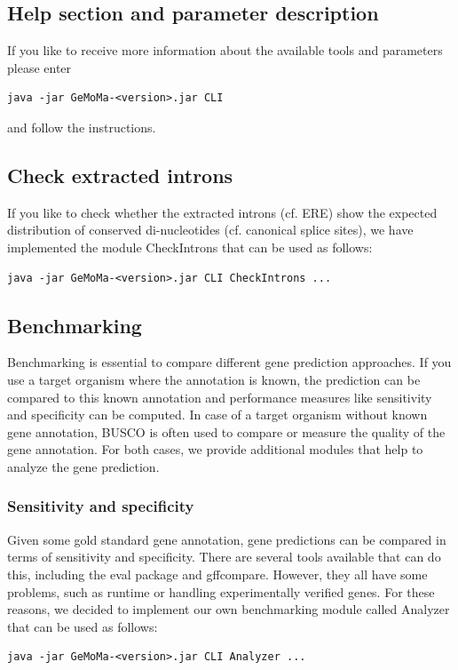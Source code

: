 \documentclass{article}
\begin{document}
\subsection{Help section and parameter description}
If you like to receive more information about the available tools and parameters please enter
\begin{verbatim}
java -jar GeMoMa-<version>.jar CLI
\end{verbatim}
and follow the instructions.

\subsection{Check extracted introns}
If you like to check whether the extracted introns (cf. ERE) show the expected distribution of conserved di-nucleotides (cf. canonical splice sites), we have implemented the module CheckIntrons that can be used as follows:
\begin{verbatim}
java -jar GeMoMa-<version>.jar CLI CheckIntrons ...
\end{verbatim}

\subsection{Benchmarking}
Benchmarking is essential to compare different gene prediction approaches. If you use a target organism where the annotation is known, the prediction can be compared to this known annotation and performance measures like sensitivity and specificity can be computed. In case of a target organism without known gene annotation, BUSCO is often used to compare or measure the quality of the gene annotation. For both cases, we provide additional modules that help to analyze the gene prediction.

\subsubsection{Sensitivity and specificity}
Given some gold standard gene annotation, gene predictions can be compared in terms of sensitivity and specificity. There are several tools available that can do this, including the eval package  and gffcompare. However, they all have some problems, such as runtime or handling experimentally verified genes. For these reasons, we decided to implement our own benchmarking module called Analyzer that can be used as follows:
\begin{verbatim}
java -jar GeMoMa-<version>.jar CLI Analyzer ...
\end{verbatim}
\end{document}
